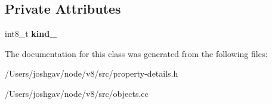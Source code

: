 \subsection*{Private Attributes}
\begin{DoxyCompactItemize}
\item 
int8\+\_\+t {\bfseries kind\+\_\+}\hypertarget{classv8_1_1internal_1_1_representation_a43b1fa5d837e760fdc9196d9673e94af}{}\label{classv8_1_1internal_1_1_representation_a43b1fa5d837e760fdc9196d9673e94af}

\end{DoxyCompactItemize}


The documentation for this class was generated from the following files\+:\begin{DoxyCompactItemize}
\item 
/\+Users/joshgav/node/v8/src/property-\/details.\+h\item 
/\+Users/joshgav/node/v8/src/objects.\+cc\end{DoxyCompactItemize}

